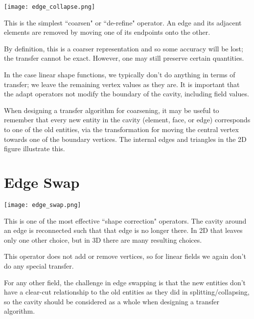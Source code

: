 \documentclass{article}
\begin{document}
{\center\texttt{[image: edge\_collapse.png]}}

This is the simplest ``coarsen" or ``de-refine" operator.
An edge and its adjacent elements are removed
by moving one of its endpoints onto the other.

By definition, this is a coarser representation and
so some accuracy will be lost; the transfer cannot
be exact.
However, one may still preserve certain quantities.

In the case linear shape functions, we typically
don't do anything in terms of transfer; we leave
the remaining vertex values as they are.
It is important that the adapt operators not modify
the boundary of the cavity, including field values.

When designing a transfer algorithm for coarsening,
it may be useful to remember that every new entity
in the cavity (element, face, or edge) corresponds
to one of the old entities, via the transformation
for moving the central vertex towards one of the
boundary vertices.
The internal edges and triangles in the 2D figure illustrate this.

\section{Edge Swap}

{\center\texttt{[image: edge\_swap.png]}}

This is one of the most effective ``shape correction" operators.
The cavity around an edge is reconnected such that
that edge is no longer there.
In 2D that leaves only one other choice, but in 3D
there are many resulting choices.

This operator does not add or remove vertices, so for linear
fields we again don't do any special transfer.

For any other field, the challenge in edge swapping is that
the new entities don't have a clear-cut relationship
to the old entities as they did in splitting/collapsing,
so the cavity should be considered
as a whole when designing a transfer algorithm.
\end{document}
